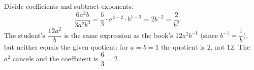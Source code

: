 Divide coefficients and subtract exponents:
\[
\dfrac{6a^2b}{3a^2b^3}=\dfrac{6}{3}\cdot a^{2-2}\cdot b^{1-3}=2b^{-2}=\boxed{\dfrac{2}{b^2}}.
\]
The student's $\dfrac{12a^2}{b}$ is the same expression as the book's $12a^2b^{-1}$ (since $b^{-1}=\dfrac{1}{b}$), but neither equals the given quotient: for $a=b=1$ the quotient is $2$, not $12$. The $a^2$ cancels and the coefficient is $\dfrac{6}{3}=2$.
